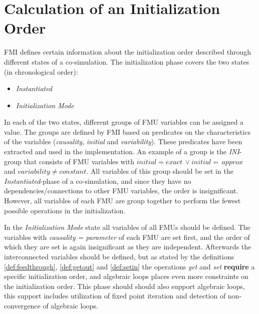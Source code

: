 \documentclass[runningheads]{llncs}
\begin{document}
\section{Calculation of an Initialization Order}\label{sc:initilization}
FMI defines certain information about the initialization order described through different states of a co-simulation. The initialization phase covers the two states (in chronological order):
\begin{itemize}
    \item \textit{Instantiated}
    \item \textit{Initialization Mode}
\end{itemize}
In each of the two states, different groups of FMU variables can be assigned a value. The groups are defined by FMI based on predicates on the characteristics of the variables (\textit{causality}, \textit{initial} and \textit{variability}). These predicates have been extracted and used in the implementation. 
An example of a group is the \textit{INI}-group that consists of FMU variables with $initial = exact\, \lor initial = \,approx $  and $variability \neq constant$. All variables of this group should be set in the \textit{Instantiated}-phase of a co-simulation, and since they have no dependencies/connections to other FMU variables, the order is insignificant. However, all variables of each FMU are group together to perform the fewest possible operations in the initialization. 

In the \textit{Initialization Mode} state all variables of all FMUs should be defined.
The variables with \textit{causality = parameter} of each FMU are set first, and the order of which they are set is again insignificant as they are independent.
Afterwards the interconnected variables should be defined, but as stated by the definitions \ref{def:feedthrough}, \ref{def:getout} and \ref{def:setin} the operations \textit{get} and \textit{set} \textbf{require} a specific initialization order, and algebraic loops places even more constraints on the initialization order. This phase should should also support algebraic loops, this support includes utilization of fixed point iteration and detection of non-convergence of algebraic loops.
\end{document}
